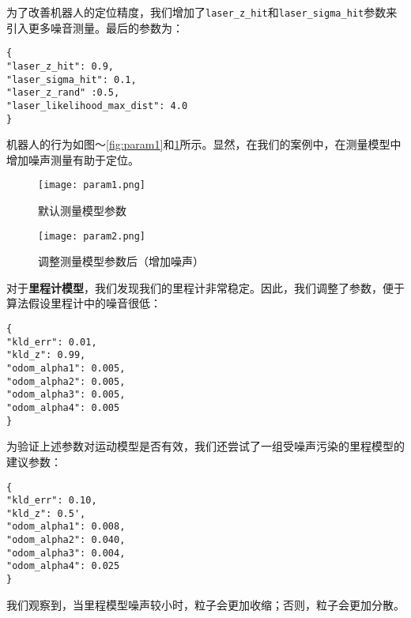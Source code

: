 为了改善机器人的定位精度，我们增加了\texttt{laser\_z\_hit}和\texttt{laser\_sigma\_hit}参数来引入更多噪音测量。最后的参数为：

\lstset{language=json}
\begin{lstlisting}
{
"laser_z_hit": 0.9,
"laser_sigma_hit": 0.1,
"laser_z_rand" :0.5,
"laser_likelihood_max_dist": 4.0
}
\end{lstlisting}
机器人的行为如图〜\ref{fig:param1}和\ref{fig:param2}所示。显然，在我们的案例中，在测量模型中增加噪声测量有助于定位。

\begin{figure}[!tb]
	\texttt{[image: param1.png]}
	\caption{默认测量模型参数}%
	\label{fig:param1}
	\endminipage\hfill
	\texttt{[image: param2.png]}
	\caption{调整测量模型参数后（增加噪声）}%
	\label{fig:param2}
	\endminipage\hfill
\end{figure}


对于\textbf{里程计模型}，我们发现我们的里程计非常稳定。因此，我们调整了参数，便于算法假设里程计中的噪音很低：

\lstset{language=json}
\begin{lstlisting}
{   
"kld_err": 0.01,
"kld_z": 0.99,
"odom_alpha1": 0.005,
"odom_alpha2": 0.005,
"odom_alpha3": 0.005,
"odom_alpha4": 0.005
}
\end{lstlisting}
为验证上述参数对运动模型是否有效，我们还尝试了一组受噪声污染的里程模型的建议参数：
\lstset{language=json}
\begin{lstlisting}
{
"kld_err": 0.10,
"kld_z": 0.5',                                                                            
"odom_alpha1": 0.008,                                                                     
"odom_alpha2": 0.040,                                                                     
"odom_alpha3": 0.004,                                                                     
"odom_alpha4": 0.025                                                                      
} 
\end{lstlisting}
我们观察到，当里程模型噪声较小时，粒子会更加收缩；否则，粒子会更加分散。

